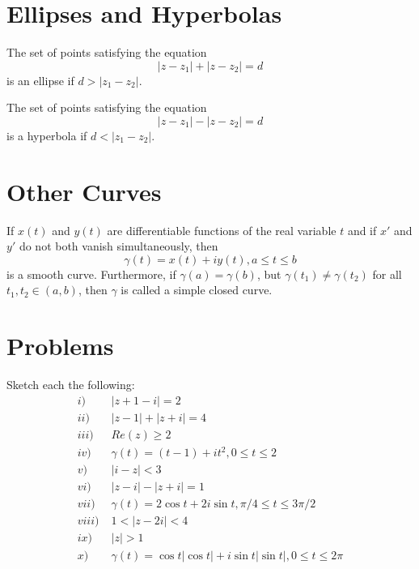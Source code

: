 \documentclass[handout]{ximera}
\begin{document}
\section{Ellipses and Hyperbolas}

\begin{example}[example 6]
The set of points satisfying the equation
\[
|z-z_1| + |z-z_2| = d
\]
is an ellipse if $d > |z_1 -z_2|$.
\end{example}


\begin{example}[example 7]
The set of points satisfying the equation
\[
|z-z_1| - |z-z_2| = d
\]
is a hyperbola if $d < |z_1 -z_2|$.
\end{example}



\section{Other Curves}


\begin{example}[example 8]
If $x(t)$ and $y(t)$ are differentiable functions of the real variable $t$ and if $x'$ and $y'$ do not both vanish simultaneously,
then
\[
\gamma(t)= x(t) + iy(t),  a \leq t \leq b
\]
is a smooth curve. Furthermore, if $\gamma(a) =\gamma(b)$, but $\gamma(t_1) \neq \gamma(t_2)$ for all $t_1,t_2 \in (a,b)$,
then $\gamma$ is called a simple closed curve.

\end{example}


\section{Problems}

Sketch each the following:\\
\begin{align*}
i) & \; |z+1-i| = 2 \\
ii) &  \; |z-1| + |z+i| = 4 \\
iii) & \;  Re(z) \geq 2 \\
iv) &  \; \gamma(t) = (t-1) + it^2, 0\leq t \leq 2 \\
v) &  \; |i- z| < 3 \\
vi) &  \; |z-i| - |z+i| = 1 \\
vii) & \;  \gamma(t) = 2\cos t + 2i\sin t , \pi/4 \leq t \leq 3\pi/2 \\
viii) &  \; 1 < |z -2i| < 4 \\
ix) & \;  |z| > 1 \\
x) &  \; \gamma(t) = \cos t |\cos t| + i\sin t |\sin t|, 0 \leq t \leq 2\pi
\end{align*}
\end{document}
